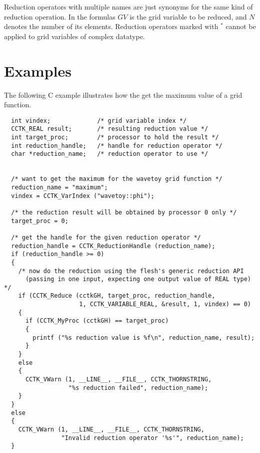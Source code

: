 \documentclass{article}
\begin{document}
Reduction operators with multiple names are just synonyms for the same kind of
reduction operation. In the formulas $GV$ is the grid variable to be reduced,
and $N$ denotes the number of its elements. Reduction operators marked with
$^*$ cannot be applied to grid variables of complex datatype.
%
%
\section{Examples}
%
The following C example illustrates how the get the maximum value of a grid
function.
%
\begin{verbatim}
  int vindex;             /* grid variable index */
  CCTK_REAL result;       /* resulting reduction value */
  int target_proc;        /* processor to hold the result */
  int reduction_handle;   /* handle for reduction operator */
  char *reduction_name;   /* reduction operator to use */


  /* want to get the maximum for the wavetoy grid function */
  reduction_name = "maximum";
  vindex = CCTK_VarIndex ("wavetoy::phi");

  /* the reduction result will be obtained by processor 0 only */
  target_proc = 0;

  /* get the handle for the given reduction operator */
  reduction_handle = CCTK_ReductionHandle (reduction_name);
  if (reduction_handle >= 0)
  {
    /* now do the reduction using the flesh's generic reduction API
      (passing in one input, expecting one output value of REAL type) */
    if (CCTK_Reduce (cctkGH, target_proc, reduction_handle,
                     1, CCTK_VARIABLE_REAL, &result, 1, vindex) == 0)
    {
      if (CCTK_MyProc (cctkGH) == target_proc)
      {
        printf ("%s reduction value is %f\n", reduction_name, result);
      }
    }
    else
    {
      CCTK_VWarn (1, __LINE__, __FILE__, CCTK_THORNSTRING,
                  "%s reduction failed", reduction_name);
    }
  }
  else
  {
    CCTK_VWarn (1, __LINE__, __FILE__, CCTK_THORNSTRING,
                "Invalid reduction operator '%s'", reduction_name);
  }
\end{verbatim}

\end{document}
